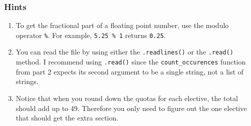 \documentclass[12pt]{article}
\begin{document}
\subsubsection*{Hints}

\begin{enumerate}
\item To get the fractional part of a floating point number, use the modulo operator \verb|%|.  For example, \verb|5.25 % 1| returns \verb|0.25|.

\item You can read the file by using either the \verb|.readlines()| or the \verb|.read()| method.  I recommend using \verb|.read()| since the \verb|count_occurences| function from part 2 expects its second argument to be a single string, not a list of strings.  

\item Notice that when you round down the quotas for each elective, the total should add up to 49.  Therefore you only need to figure out the one elective that should get the extra section.  

\end{enumerate}
\end{document}
